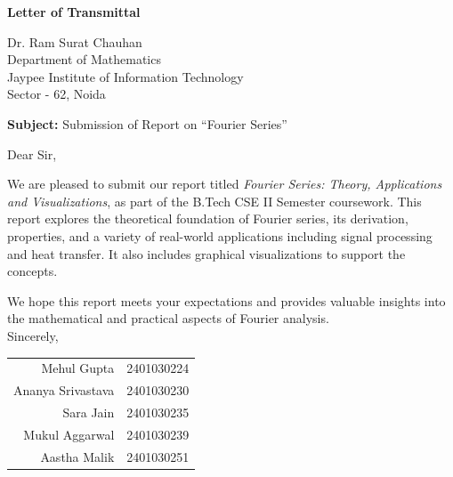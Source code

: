 \documentclass[12pt,a4paper]{article}
\begin{document}
\begin{center}
    \Large\textbf{Letter of Transmittal}
\end{center}
\vspace{1cm}

\noindent
Dr. Ram Surat Chauhan \\
Department of Mathematics \\
Jaypee Institute of Information Technology \\
Sector - 62, Noida \\

\vspace{1cm}

\noindent
\textbf{Subject:} Submission of Report on \textquotedblleft Fourier Series\textquotedblright \\

\vspace{1cm}

\noindent
Dear Sir, \\

\vspace{1em}

\noindent
We are pleased to submit our report titled \textit{Fourier Series: Theory, Applications and Visualizations}, as part of the B.Tech CSE II Semester coursework. This report explores the theoretical foundation of Fourier series, its derivation, properties, and a variety of real-world applications including signal processing and heat transfer. It also includes graphical visualizations to support the concepts. \\

\vspace{1em}

\noindent
We hope this report meets your expectations and provides valuable insights into the mathematical and practical aspects of Fourier analysis. \\

\vspace{2em}
\noindent
Sincerely, \\
\vspace{1em}
\noindent
\begin{tabular}{rl}
    Mehul Gupta & 2401030224 \\
    Ananya Srivastava & 2401030230 \\
    Sara Jain & 2401030235 \\
    Mukul Aggarwal & 2401030239 \\
    Aastha Malik & 2401030251 \\
\end{tabular}
\end{document}
